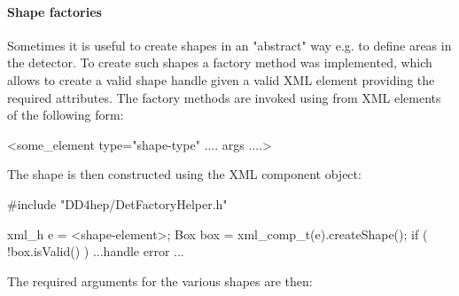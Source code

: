 \documentclass[10pt,a4paper]{article}
\begin{document}
\paragraph{Shape factories} Sometimes it is useful to create shapes in an "abstract" way
e.g. to define areas in the detector. To create such shapes a factory method was implemented,
which allows to create a valid shape handle given a valid XML element providing the 
required attributes. The factory methods are invoked using from XML elements of the following form:
\begin{unnumberedcode}
  <some_element type="shape-type" .... args ....>
\end{unnumberedcode}
The shape is then constructed using the XML component object:
\begin{unnumberedcode}
#include "DD4hep/DetFactoryHelper.h"

  xml_h e = <shape-element>;
  Box box = xml_comp_t(e).createShape();
  if ( !box.isValid() ) { ...handle error ... }
\end{unnumberedcode}
The required arguments for the various shapes are then:
\end{document}
